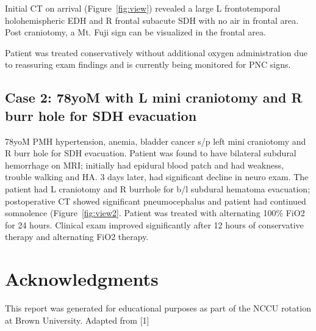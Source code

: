 \documentclass[fleqn,10pt]{olplainarticle}
\begin{document}
Initial CT on arrival (Figure~\ref{fig:view}) revealed a large L frontotemporal holohemispheric EDH and R frontal subacute SDH with no air in frontal area. Post craniotomy, a Mt. Fuji sign can be visualized in the frontal area. 

Patient was treated conservatively without additional oxygen administration due to reassuring exam findings and is currently being monitored for PNC signs. 

\subsection*{Case 2: 78yoM with L mini craniotomy and R burr hole for SDH evacuation}
78yoM PMH hypertension, anemia, bladder cancer s/p left mini craniotomy and R burr hole for SDH evacuation. Patient was found to have bilateral subdural hemorrhage on MRI; initially had epidural blood patch and had weakness, trouble walking and HA. 3 days later, had significant decline in neuro exam. The patient had L craniotomy and R burrhole for b/l subdural hematoma evacuation; postoperative CT showed significant pneumocephalus and patient had continued somnolence (Figure~\ref{fig:view2}.
Patient was treated with alternating 100\% FiO2 for 24 hours. Clinical exam improved significantly after 12 hours of conservative therapy and alternating FiO2 therapy. 


\section*{Acknowledgments}
This report was generated for educational purposes as part of the NCCU rotation at Brown University. Adapted from [1]


\end{document}
